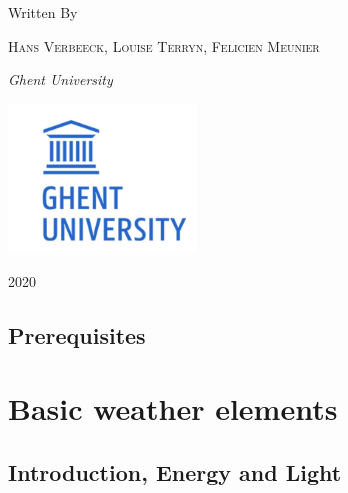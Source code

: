 \documentclass[oneside]{book}
\begin{document}
\begin{titlepage}
	Written By
	
	\vspace{0.5\baselineskip} %
	
	{\scshape Hans Verbeeck, Louise Terryn, Felicien Meunier \\} %
	
	\vspace{0.5\baselineskip} %
	
	\textit{Ghent University \\} %
	
	\vfill %
	
	
	
	\includegraphics[width = 50mm]{figures/UGhent2.png}
	
	\vspace{0.3\baselineskip} %
	
	2020 %
	

\end{titlepage}

{
\setcounter{tocdepth}{1}
\tableofcontents
}
\chapter*{Prerequisites}\label{prerequisites}

\mainmatter

\part{Basic weather
elements}\label{part-basic-weather-elements}

\chapter{Introduction, Energy and Light}\label{intro}
\end{document}
